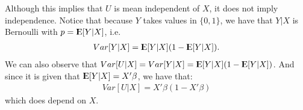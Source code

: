 \documentclass[12pt]{paper}
\newcommand{\Expect}{{\rm I\kern-.3em E}}
\begin{document}
Although this implies that $U$ is mean independent of $X$, it does not imply independence. Notice that because $Y$ takes values in $\{0,1\}$, we have that $Y|X$ is Bernoulli with $p=\Expect[Y|X]$, i.e.
\begin{align*}
Var[Y|X]=\Expect[Y|X](1-\Expect[Y|X]).
\end{align*} 
We can also observe that $Var[U|X]=Var[Y|X]=\Expect[Y|X](1-\Expect[Y|X])$. And since it is given that $\Expect[Y|X]=X' \beta$, we have that:
\begin{align*}
Var[U|X]=X' \beta(1-X' \beta)
\end{align*} 
which does depend on $X$.
\end{document}
